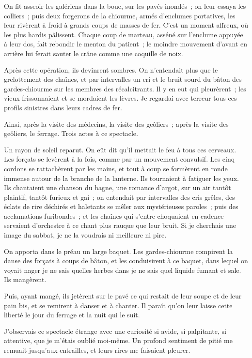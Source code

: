 \documentclass[french,twoside]{book} %
\begin{document}
On fit asseoir les galériens dans la boue, sur les pavés inondés ; on leur essaya les colliers ; puis deux forgerons de la chiourme, armés d’enclumes portatives, les leur rivèrent à froid à grands coups de masses de fer. C’est un moment affreux, où les plus hardis pâlissent. Chaque coup de marteau, asséné sur l’enclume  appuyée à leur dos, fait rebondir le menton du patient ; le moindre mouvement d’avant en arrière lui ferait sauter le crâne comme une coquille de noix.\par
Après cette opération, ils devinrent sombres. On n’entendait plus que le grelottement des chaînes, et par intervalles un cri et le bruit sourd du bâton des gardes-chiourme sur les membres des récalcitrants. Il y en eut qui pleurèrent ; les vieux frissonnaient et se mordaient les lèvres. Je regardai avec terreur tous ces profils sinistres dans leurs cadres de fer.\par
Ainsi, après la visite des médecins, la visite des geôliers ; après la visite des geôliers, le ferrage. Trois actes à ce spectacle.\par
Un rayon de soleil reparut. On eût dit qu’il mettait le feu à tous ces cerveaux. Les forçats se levèrent à la fois, comme par un mouvement convulsif. Les cinq cordons se rattachèrent par les mains, et tout à coup se formèrent en ronde immense autour de la branche de la lanterne. Ils tournaient à fatiguer les yeux. Ils chantaient une chanson du bagne, une romance d’argot, sur un air tantôt plaintif, tantôt furieux et gai ; on entendait par intervalles des cris grêles, des éclats de rire déchirés et haletants se mêler aux mystérieuses paroles ; puis des acclamations furibondes ; et les chaînes qui s’entre-choquaient en cadence servaient d’orchestre à ce chant plus rauque que leur bruit. Si je cherchais une image du sabbat, je ne la voudrais ni meilleure ni pire.\par
On apporta dans le préau un large baquet. Les gardes-chiourme rompirent la danse des forçats à coups  de bâton, et les conduisirent à ce baquet, dans lequel on voyait nager je ne sais quelles herbes dans je ne sais quel liquide fumant et sale. Ils mangèrent.\par
Puis, ayant mangé, ils jetèrent sur le pavé ce qui restait de leur soupe et de leur pain bis, et se remirent à danser et à chanter. Il paraît qu’on leur laisse cette liberté le jour du ferrage et la nuit qui le suit.\par
J’observais ce spectacle étrange avec une curiosité si avide, si palpitante, si attentive, que je m’étais oublié moi-même. Un profond sentiment de pitié me remuait jusqu’aux entrailles, et leurs rires me faisaient pleurer.\par
\end{document}
